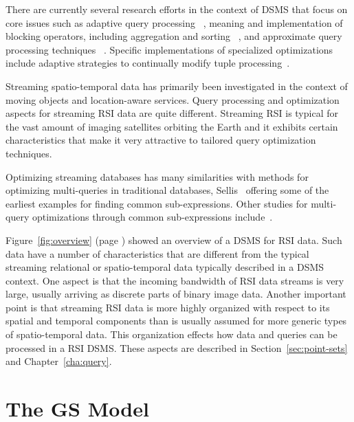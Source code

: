 \documentclass{ucdthesis}       %
\begin{document}
There are currently several research efforts in the context of
\ac{DSMS} that focus on core issues such as adaptive query processing
~\cite{chen02desig-evaluat, madden02fjord-stream,
  madden02contin-adapt,shah03flux}, meaning and implementation of
blocking operators, including aggregation and sorting
~\cite{haas99rippl-joins,luo02scalable}, and approximate query
processing techniques ~\cite{dobra02proces,gehrk01comput-correl}.
Specific implementations of specialized optimizations include adaptive
strategies to continually modify tuple processing~\cite{avnur00eddies,
  heller00adapt-query, madden02fjord-stream, madden02contin-adapt}.

Streaming spatio-temporal data has primarily been investigated in the
context of moving objects and location-aware services.  Query
processing and optimization aspects for streaming \acf{RSI} data are
quite different. Streaming \acs{RSI} is typical for the vast amount of
imaging satellites orbiting the Earth and it exhibits certain
characteristics that make it very attractive to tailored query
optimization techniques.

Optimizing streaming databases has many similarities with methods for
optimizing multi-queries in traditional databases,
Sellis~\cite{sellis90multip-query} offering some of the earliest
examples for finding common sub-expressions.  Other studies for
multi-query optimizations through common sub-expressions
include~\cite{graef93volcan-optim,pellen97compl-trans,roy00effic}.


Figure~\ref{fig:overview} (page \pageref{fig:overview}) showed an
overview of a \acf{DSMS} for \acf{RSI} data.  Such data have a number
of characteristics that are different from the typical streaming
relational or spatio-temporal data typically described in a \acs{DSMS}
context.  One aspect is that the incoming bandwidth of \acs{RSI} data
streams is very large, usually arriving as discrete parts of binary
image data.  Another important point is that streaming \acs{RSI} data
is more highly organized with respect to its spatial and temporal
components than is usually assumed for more generic types of
spatio-temporal data.  This organization effects how data and queries
can be processed in a \ac{RSI} \acs{DSMS}.  These aspects are
described in Section~\ref{sec:point-sets} and Chapter~\ref{cha:query}.


\chapter{The \ac{GS} Model}
\label{cha:models}
\end{document}
